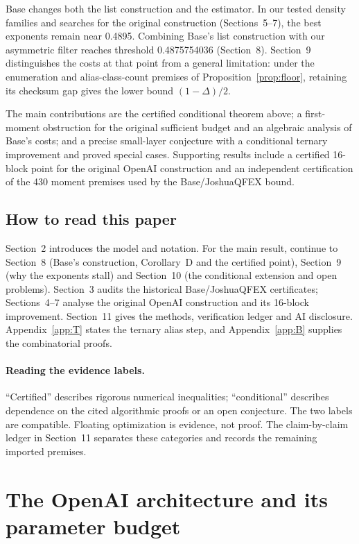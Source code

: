 \documentclass[11pt]{article}
\theoremstyle{plain}
\begin{document}
Base changes both the list construction and the estimator. In our tested density families and searches for the original construction (Sections~5--7), the best exponents remain near 0.4895. Combining Base's list construction with our asymmetric filter reaches threshold 0.4875754036 (Section~8). Section~9 distinguishes the costs at that point from a general limitation: under the enumeration and alias-class-count premises of Proposition~\ref{prop:floor}, retaining its checksum gap gives the lower bound $(1-\Delta)/2$.

The main contributions are the certified conditional theorem above; a first-moment obstruction for the original sufficient budget and an algebraic analysis of Base's costs; and a precise small-layer conjecture with a conditional ternary improvement and proved special cases. Supporting results include a certified 16-block point for the original OpenAI construction and an independent certification of the 430 moment premises used by the Base/JoshuaQFEX bound.

\subsection*{How to read this paper}
Section~2 introduces the model and notation. For the main result, continue to Section~8 (Base's construction, Corollary~D and the certified point), Section~9 (why the exponents stall) and Section~10 (the conditional extension and open problems). Section~3 audits the historical Base/JoshuaQFEX certificates; Sections~4--7 analyse the original OpenAI construction and its 16-block improvement. Section~11 gives the methods, verification ledger and AI disclosure. Appendix~\ref{app:T} states the ternary alias step, and Appendix~\ref{app:B} supplies the combinatorial proofs.


\paragraph{Reading the evidence labels.}
``Certified'' describes rigorous numerical inequalities; ``conditional'' describes dependence on the cited algorithmic proofs or an open conjecture. The two labels are compatible. Floating optimization is evidence, not proof. The claim-by-claim ledger in Section~11 separates these categories and records the remaining imported premises.


\section{The OpenAI architecture and its parameter budget}
\end{document}
